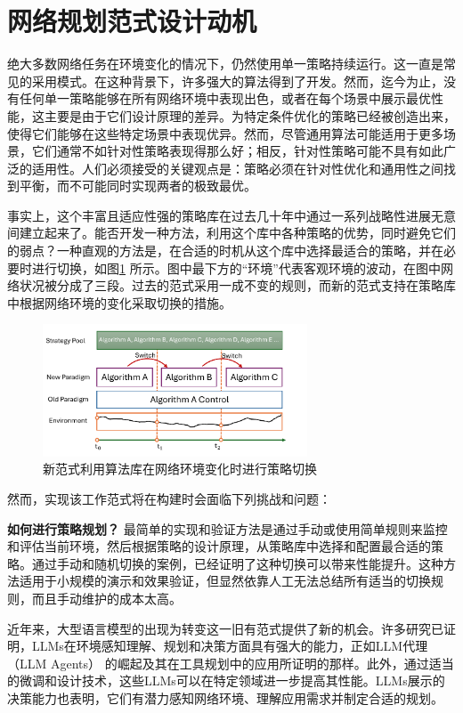 \section{网络规划范式设计动机}
绝大多数网络任务在环境变化的情况下，仍然使用单一策略持续运行。这一直是常见的采用模式。在这种背景下，许多强大的算法得到了开发。然而，迄今为止，没有任何单一策略能够在所有网络环境中表现出色，或者在每个场景中展示最优性能，这主要是由于它们设计原理的差异。为特定条件优化的策略已经被创造出来，使得它们能够在这些特定场景中表现优异。然而，尽管通用算法可能适用于更多场景，它们通常不如针对性策略表现得那么好；相反，针对性策略可能不具有如此广泛的适用性。人们必须接受的关键观点是：策略必须在针对性优化和通用性之间找到平衡，而不可能同时实现两者的极致最优。

事实上，这个丰富且适应性强的策略库在过去几十年中通过一系列战略性进展无意间建立起来了。能否开发一种方法，利用这个库中各种策略的优势，同时避免它们的弱点？一种直观的方法是，在合适的时机从这个库中选择最适合的策略，并在必要时进行切换，如图\ref{fig_paradigm_change} 所示。图中最下方的“环境”代表客观环境的波动，在图中网络状况被分成了三段。过去的范式采用一成不变的规则，而新的范式支持在策略库中根据网络环境的变化采取切换的措施。

\begin{figure} [ht]
\centering
\includegraphics[width=0.7\textwidth]{figures/chap04/Paradigm_change.pdf} 
\caption{新范式利用算法库在网络环境变化时进行策略切换}
\label{fig_paradigm_change}
\end{figure}

然而，实现该工作范式将在构建时会面临下列挑战和问题：

\textbf{如何进行策略规划？} 最简单的实现和验证方法是通过手动或使用简单规则来监控和评估当前环境，然后根据策略的设计原理，从策略库中选择和配置最合适的策略。通过手动和随机切换的案例，已经证明了这种切换可以带来性能提升。这种方法适用于小规模的演示和效果验证，但显然依靠人工无法总结所有适当的切换规则，而且手动维护的成本太高。

近年来，大型语言模型的出现为转变这一旧有范式提供了新的机会。许多研究已证明，LLMs在环境感知理解、规划和决策方面具有强大的能力，正如LLM代理（LLM Agents）\cite{wang2024survey} 的崛起及其在工具规划中的应用所证明的那样。此外，通过适当的微调和设计技术，这些LLMs可以在特定领域进一步提高其性能。LLMs展示的决策能力也表明，它们有潜力感知网络环境、理解应用需求并制定合适的规划。

